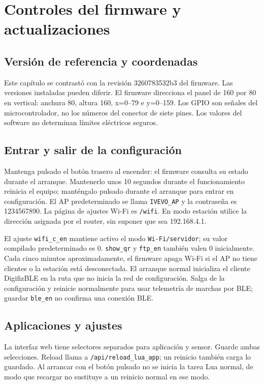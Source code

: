 \chapter{Controles del firmware y actualizaciones}\label{ch:firmware}
\section{Versión de referencia y coordenadas}
Este capítulo se contrastó con la revisión 3260783532b3 del firmware. Las versiones instaladas pueden diferir. El firmware direcciona el panel de 160 por 80 en vertical: anchura 80, altura 160, x=0–79 e y=0–159. Los GPIO son señales del microcontrolador, no los números del conector de siete pines. Los valores del software no determinan límites eléctricos seguros.

\section{Entrar y salir de la configuración}
Mantenga pulsado el botón trasero al encender: el firmware consulta su estado durante el arranque. Mantenerlo unos 10 segundos durante el funcionamiento reinicia el equipo; manténgalo pulsado durante el arranque para entrar en configuración. El AP predeterminado se llama \nolinkurl{IVEVO_AP} y la contraseña es 1234567890. La página de ajustes Wi-Fi es \nolinkurl{/wifi}. En modo estación utilice la dirección asignada por el router, sin suponer que sea 192.168.4.1.

El ajuste \nolinkurl{wifi_c_en} mantiene activo el modo \nolinkurl{Wi-Fi/servidor}; su valor compilado predeterminado es 0. \nolinkurl{show_qr} y \nolinkurl{ftp_en} también valen 0 inicialmente. Cada cinco minutos aproximadamente, el firmware apaga Wi-Fi si el AP no tiene clientes o la estación está desconectada. El arranque normal inicializa el cliente DigifizBLE en la ruta que no inicia la red de configuración. Salga de la configuración y reinicie normalmente para usar telemetría de marchas por BLE; guardar \nolinkurl{ble_en} no confirma una conexión BLE.

\section{Aplicaciones y ajustes}
La interfaz web tiene selectores separados para aplicación y sensor. Guarde ambas selecciones. Reload llama a \nolinkurl{/api/reload_lua_app}; un reinicio también carga lo guardado. Al arrancar con el botón pulsado no se inicia la tarea Lua normal, de modo que recargar no sustituye a un reinicio normal en ese modo.

